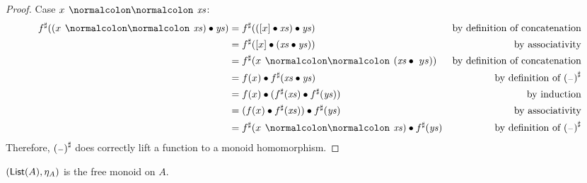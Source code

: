 \begin{toappendix}
\begin{proof}
        Case $x \cons \xs$:
        \begin{align*}
            \ext{f}((x \cons \xs) \mult \ys)
             & = \ext{f}(([ x ] \mult \xs) \mult \ys)         & \text{by definition of concatenation}    \\
             & = \ext{f}([ x ] \mult (\xs \mult \ys))         & \text{by associativity}                  \\
             & = \ext{f}(x \cons (\xs \mult \ ys))            & \text{by definition of concatenation}    \\
             & = f(x) \mult \ext{f}(\xs \mult \ys)            & \text{by definition of $\ext{(\blank)}$} \\
             & = f(x) \mult (\ext{f}(\xs) \mult \ext{f}(\ys)) & \text{by induction}                      \\
             & = (f(x) \mult \ext{f}(\xs)) \mult \ext{f}(\ys) & \text{by associativity}                  \\
             & = \ext{f}(x \cons \xs) \mult \ext{f}(\ys)      & \text{by definition of $\ext{(\blank)}$} \\
        \end{align*}
        Therefore, $\ext{(\blank)}$ does correctly lift a function to a monoid homomorphism.
    \end{proof}
\end{toappendix}
%
\begin{propositionrep}
    $(\operatorname{\mathsf{List}}(A),\eta_A)$ is the free monoid on $A$.
\end{propositionrep}

